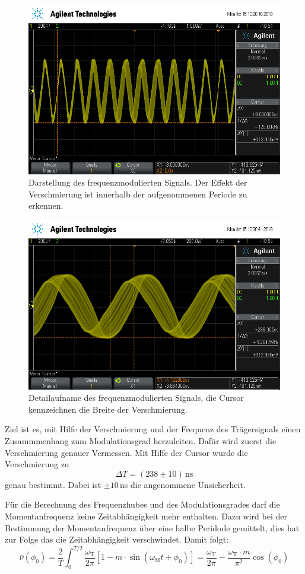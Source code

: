\begin{figure}
  \centering
  \includegraphics[width=0.7\linewidth]{ressources/scope_455.png}
  \caption{Darstellung des frequenzmodulierten Signals. Der Effekt der
  Verschmierung ist innerhalb der aufgenommenen Periode zu erkennen.}
  \label{sig1}
\end{figure}
\begin{figure}
  \centering
  \includegraphics[width=0.7\linewidth]{ressources/scope_456.png}
  \caption{Detailaufname des frequenzmodulierten Signals, die
  Cursor kennzeichnen die Breite der Verschmierung.}
  \label{sig2}
\end{figure}
Ziel ist es, mit Hilfe der Verschmierung und der Frequenz des Trägersignals
einen Zusammmenhang zum Modulationsgrad herzuleiten. Dafür wird zuerst
die Verschmierung genauer Vermessen. Mit Hilfe der Cursor wurde die
Verschmierung zu
$$\Delta T = (238\pm 10)\, \text{ns}$$
genau bestimmt. Dabei ist $\pm 10\,$ns die angenommene Unsicherheit.

Für die Berechnung des Frequenzhubes und des Modulationsgrades darf die
Momentanfrequenz keine Zeitabhängigkeit mehr enthalten. Dazu wird bei der
Bestimmung der Momentanfrequenz über eine halbe Peridode gemittelt, dies
hat zur Folge das die Zeitabhängigkeit verschwindet. Damit folgt:
$$\bar{\nu}(\phi_0)=\frac{2}{T} \int_0^{T/2} \frac{\omega_\text{T}}{2\pi}
[1-m\cdot \sin (\omega_\text{M}t+ \phi_0)]=\frac{\omega_\text{T}}{2\pi}-
\frac{\omega_\text{T}\cdot m}{\pi^2}\cos(\phi_0)$$

